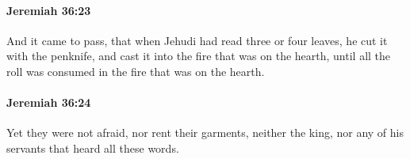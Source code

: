 		\paragraph{Jeremiah 36:23} %
			\label{JEREMIAH-36-23}

			And it came to pass, that when Jehudi had read three or four leaves, he cut it with the penknife, and cast it into the fire that was on the hearth, until all the roll was consumed in the fire that was on the hearth.


		\paragraph{Jeremiah 36:24} %
			\label{JEREMIAH-36-24}

			Yet they were not afraid, nor rent their garments, neither the king, nor any of his servants that heard all these words.



